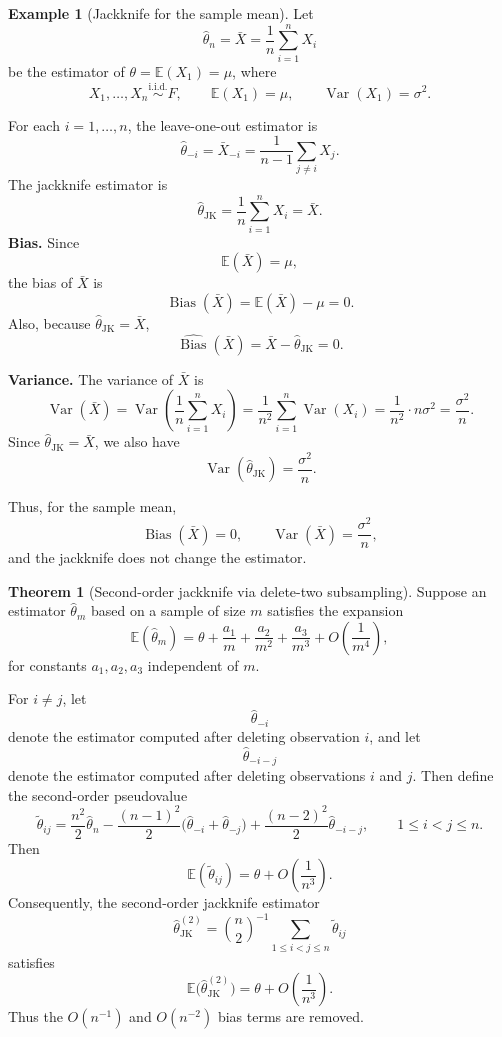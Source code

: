 \documentclass[11pt]{article}
\theoremstyle{definition}
\newtheorem{exmp}{Example}[section]
\newtheorem{theo}{Theorem}[section]
\begin{document}
\begin{exmp}[Jackknife for the sample mean]
Let
\[
\hat{\theta}_n=\bar X=\frac{1}{n}\sum_{i=1}^n X_i
\]
be the estimator of \(\theta=\mathbb{E}(X_1)=\mu\), where
\[
X_1,\dots,X_n \overset{\text{i.i.d.}}{\sim} F,
\qquad
\mathbb{E}(X_1)=\mu,
\qquad
\operatorname{Var}(X_1)=\sigma^2.
\]

For each \(i=1,\dots,n\), the leave-one-out estimator is
\[
\hat{\theta}_{-i}
=
\bar X_{-i}
=
\frac{1}{n-1}\sum_{j\ne i} X_j.
\]
The jackknife estimator is
\[
\hat{\theta}_{\mathrm{JK}}
=
\frac{1}{n}\sum_{i=1}^n X_i
=
\bar X.
\]
\textbf{Bias.}
Since
\[
\mathbb{E}(\bar X)=\mu,
\]
the bias of \(\bar X\) is
\[
\operatorname{Bias}(\bar X)
=
\mathbb{E}(\bar X)-\mu
=
0.
\]
Also, because \(\hat{\theta}_{\mathrm{JK}}=\bar X\),
\[
\widehat{\operatorname{Bias}}(\bar X)
=
\bar X-\hat{\theta}_{\mathrm{JK}}
=
0.
\]

\textbf{Variance.}
The variance of \(\bar X\) is
\[
\operatorname{Var}(\bar X)
=
\operatorname{Var}\!\left(\frac{1}{n}\sum_{i=1}^n X_i\right)
=
\frac{1}{n^2}\sum_{i=1}^n \operatorname{Var}(X_i)
=
\frac{1}{n^2}\cdot n\sigma^2
=
\frac{\sigma^2}{n}.
\]
Since \(\hat{\theta}_{\mathrm{JK}}=\bar X\), we also have
\[
\operatorname{Var}(\hat{\theta}_{\mathrm{JK}})
=
\frac{\sigma^2}{n}.
\]

Thus, for the sample mean,
\[
\operatorname{Bias}(\bar X)=0,
\qquad
\operatorname{Var}(\bar X)=\frac{\sigma^2}{n},
\]
and the jackknife does not change the estimator.
\end{exmp}

\begin{theo}[Second-order jackknife via delete-two subsampling]
Suppose an estimator \(\hat\theta_m\) based on a sample of size \(m\) satisfies the expansion
\[
\mathbb{E}(\hat\theta_m)
=
\theta+\frac{a_1}{m}+\frac{a_2}{m^2}+\frac{a_3}{m^3}+O\!\left(\frac{1}{m^4}\right),
\]
for constants \(a_1,a_2,a_3\) independent of \(m\).

For \(i \neq j\), let
\[
\hat\theta_{-i}
\]
denote the estimator computed after deleting observation \(i\), and let
\[
\hat\theta_{-i-j}
\]
denote the estimator computed after deleting observations \(i\) and \(j\). Then define the second-order pseudovalue
\[
\tilde\theta_{ij}
=
\frac{n^2}{2}\hat\theta_n
-\frac{(n-1)^2}{2}\bigl(\hat\theta_{-i}+\hat\theta_{-j}\bigr)
+\frac{(n-2)^2}{2}\hat\theta_{-i-j},
\qquad 1 \le i<j \le n.
\]
Then
\[
\mathbb{E}(\tilde\theta_{ij})
=
\theta+O\!\left(\frac{1}{n^3}\right).
\]
Consequently, the second-order jackknife estimator
\[
\hat\theta_{\mathrm{JK}}^{(2)}
=
\binom{n}{2}^{-1}\sum_{1\le i<j\le n}\tilde\theta_{ij}
\]
satisfies
\[
\mathbb{E}\bigl(\hat\theta_{\mathrm{JK}}^{(2)}\bigr)
=
\theta+O\!\left(\frac{1}{n^3}\right).
\]
Thus the \(O(n^{-1})\) and \(O(n^{-2})\) bias terms are removed.
\end{theo}
\end{document}
